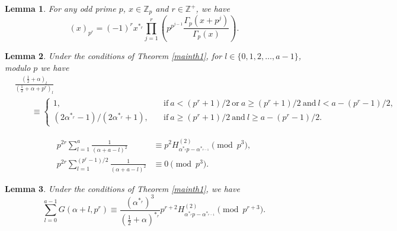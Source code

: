 \documentclass[10pt,a4paper]{amsart}
\newtheorem{lemma}{Lemma}
\def\Z{\mathbb Z}
\def\eq{\equiv}
\def\f{\frac}
\def\l{\left}
\def\r{\right}
\def\t{\text}
\begin{document}
\begin{lemma}\label{pochreduce}
For any odd prime $p$, $x\in\Z_p$ and $r\in\Z^+$, we have
$$
(x)_{p^r}=(-1)^rx^{\ast_r}\prod_{j=1}^r\l(p^{p^{j-1}}\f{\Gamma_p(x+p^j)}{\Gamma_p(x)}\r).
$$
\end{lemma}

\begin{lemma}\label{1/2+alpha}
Under the conditions of Theorem \ref{mainth1}, for $l\in\{0,1,2,\ldots,a-1\}$, modulo $p$ we have
\begin{align*}
&\f{(\f12+\alpha)_l}{(\f12+\alpha+p^r)_l}\\
&\qquad\eq \begin{cases}1,\quad&\t{if}\ a<(p^r+1)/2\ \t{or}\ a\geq(p^r+1)/2\ \t{and}\ l<a-(p^r-1)/2,\\
(2{\alpha}^{\ast_r}-1)/(2{\alpha}^{\ast_r}+1),\quad&\t{if}\ a\geq(p^r+1)/2\ \t{and}\ l\geq a-(p^r-1)/2.\end{cases}
\end{align*}
\end{lemma}

\begin{align}
\label{harmonicreduce1eq}p^{2r}\sum_{l=1}^{a}\f{1}{(\alpha+a-l)^2}&\eq p^2H_{\alpha^{\ast_r}p-\alpha^{\ast_{r-1}}}^{(2)}\pmod{p^3},\\
\label{harmonicreduce2eq}p^{2r}\sum_{l=1}^{(p^r-1)/2}\f{1}{(\alpha+a-l)^2}&\eq 0\pmod{p^3}.
\end{align}

\begin{lemma}\label{evalG}
Under the conditions of Theorem \ref{mainth1}, we have
\begin{equation}\label{evalGeq}
\sum_{l=0}^{a-1}G(\alpha+l,p^r)\eq \f{(\alpha^{\ast_r})^3}{(\f12+\alpha)^{\ast_r}}p^{r+2}H_{\alpha^{\ast_r}p-\alpha^{\ast_{r-1}}}^{(2)}\pmod{p^{r+3}}.
\end{equation}
\end{lemma}
\end{document}
